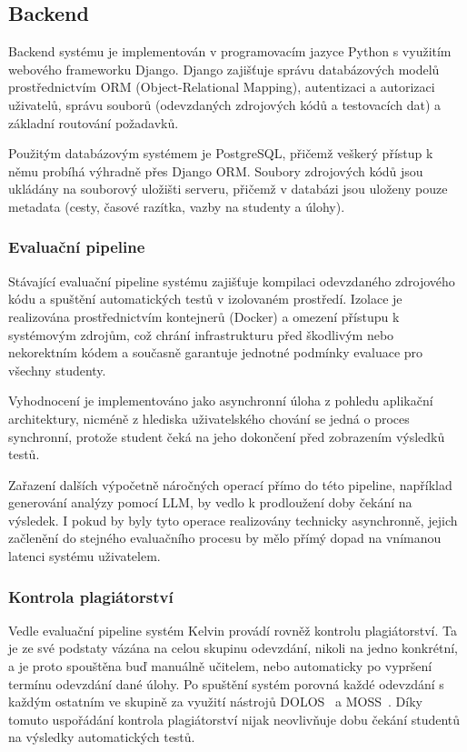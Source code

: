 \subsection{Backend}
\label{subsec:kelvin-backend}

Backend systému je implementován v programovacím jazyce Python s využitím webového frameworku Django.
Django zajišťuje správu databázových modelů prostřednictvím ORM (Object-Relational Mapping), autentizaci a autorizaci uživatelů, správu souborů (odevzdaných zdrojových kódů a testovacích dat) a základní routování požadavků.

Použitým databázovým systémem je PostgreSQL, přičemž veškerý přístup k němu probíhá výhradně přes Django ORM\@.
Soubory zdrojových kódů jsou ukládány na souborový uložišti serveru, přičemž v databázi jsou uloženy pouze metadata (cesty, časové razítka, vazby na studenty a úlohy).

\subsubsection*{Evaluační pipeline}
\label{subsubsec:kelvin-evaluation-pipeline}

Stávající evaluační pipeline systému zajišťuje kompilaci odevzdaného zdrojového kódu a spuštění automatických testů v izolovaném prostředí.
Izolace je realizována prostřednictvím kontejnerů (Docker) a omezení přístupu k systémovým zdrojům, což chrání infrastrukturu před škodlivým nebo nekorektním kódem a současně garantuje jednotné podmínky evaluace pro všechny studenty.

Vyhodnocení je implementováno jako asynchronní úloha z pohledu aplikační architektury, nicméně z hlediska uživatelského chování se jedná o proces synchronní, protože student čeká na jeho dokončení před zobrazením výsledků testů.

Zařazení dalších výpočetně náročných operací přímo do této pipeline, například generování analýzy pomocí LLM, by vedlo k prodloužení doby čekání na výsledek.
I pokud by byly tyto operace realizovány technicky asynchronně, jejich začlenění do stejného evaluačního procesu by mělo přímý dopad na vnímanou latenci systému uživatelem.

\subsubsection*{Kontrola plagiátorství}
\label{subsubsec:kelvin-plagiarism-check}

Vedle evaluační pipeline systém Kelvin provádí rovněž kontrolu plagiátorství.
Ta je ze své podstaty vázána na celou skupinu odevzdání, nikoli na jedno konkrétní, a je proto spouštěna buď manuálně učitelem, nebo automaticky po vypršení termínu odevzdání dané úlohy.
Po spuštění systém porovná každé odevzdání s každým ostatním ve skupině za využití nástrojů DOLOS~\cite{dolos} a MOSS~\cite{moss}.
Díky tomuto uspořádání kontrola plagiátorství nijak neovlivňuje dobu čekání studentů na výsledky automatických testů.

\endinput
